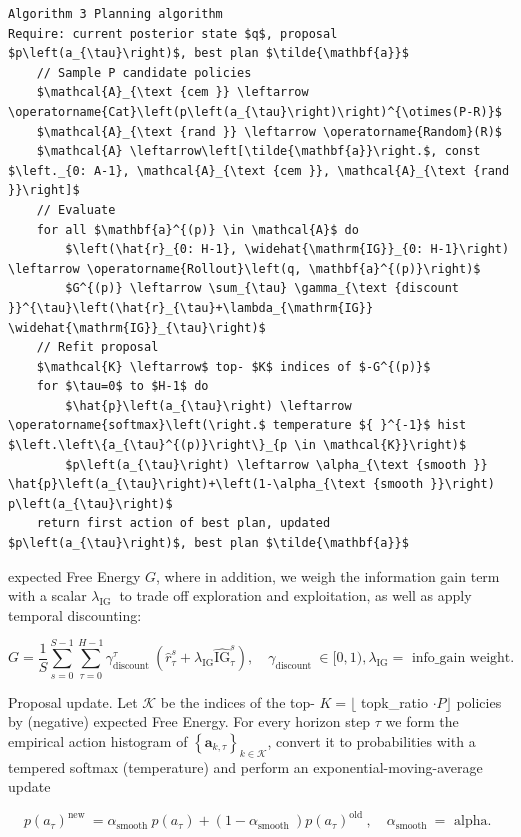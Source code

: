 \documentclass[10pt]{article}
\begin{document}
\begin{verbatim}
Algorithm 3 Planning algorithm
Require: current posterior state $q$, proposal $p\left(a_{\tau}\right)$, best plan $\tilde{\mathbf{a}}$
    // Sample P candidate policies
    $\mathcal{A}_{\text {cem }} \leftarrow \operatorname{Cat}\left(p\left(a_{\tau}\right)\right)^{\otimes(P-R)}$
    $\mathcal{A}_{\text {rand }} \leftarrow \operatorname{Random}(R)$
    $\mathcal{A} \leftarrow\left[\tilde{\mathbf{a}}\right.$, const $\left._{0: A-1}, \mathcal{A}_{\text {cem }}, \mathcal{A}_{\text {rand }}\right]$
    // Evaluate
    for all $\mathbf{a}^{(p)} \in \mathcal{A}$ do
        $\left(\hat{r}_{0: H-1}, \widehat{\mathrm{IG}}_{0: H-1}\right) \leftarrow \operatorname{Rollout}\left(q, \mathbf{a}^{(p)}\right)$
        $G^{(p)} \leftarrow \sum_{\tau} \gamma_{\text {discount }}^{\tau}\left(\hat{r}_{\tau}+\lambda_{\mathrm{IG}} \widehat{\mathrm{IG}}_{\tau}\right)$
    // Refit proposal
    $\mathcal{K} \leftarrow$ top- $K$ indices of $-G^{(p)}$
    for $\tau=0$ to $H-1$ do
        $\hat{p}\left(a_{\tau}\right) \leftarrow \operatorname{softmax}\left(\right.$ temperature ${ }^{-1}$ hist $\left.\left\{a_{\tau}^{(p)}\right\}_{p \in \mathcal{K}}\right)$
        $p\left(a_{\tau}\right) \leftarrow \alpha_{\text {smooth }} \hat{p}\left(a_{\tau}\right)+\left(1-\alpha_{\text {smooth }}\right) p\left(a_{\tau}\right)$
    return first action of best plan, updated $p\left(a_{\tau}\right)$, best plan $\tilde{\mathbf{a}}$
\end{verbatim}

expected Free Energy $G$, where in addition, we weigh the information gain term with a scalar $\lambda_{\text {IG }}$ to trade off exploration and exploitation, as well as apply temporal discounting:

$$
G=\frac{1}{S} \sum_{s=0}^{S-1} \sum_{\tau=0}^{H-1} \gamma_{\text {discount }}^{\tau}\left(\hat{r}_{\tau}^{s}+\lambda_{\mathrm{IG}} \widehat{\mathrm{IG}}_{\tau}^{s}\right), \quad \gamma_{\text {discount }} \in[0,1), \lambda_{\mathrm{IG}}=\text { info_gain weight. }
$$

Proposal update. Let $\mathcal{K}$ be the indices of the top- $K=\lfloor$ topk\_ratio $\cdot P\rfloor$ policies by (negative) expected Free Energy. For every horizon step $\tau$ we form the empirical action histogram of $\left\{\mathbf{a}_{k, \tau}\right\}_{k \in \mathcal{K}}$, convert it to probabilities with a tempered softmax (temperature) and perform an exponential-moving-average update

$$
p\left(a_{\tau}\right)^{\text {new }}=\alpha_{\text {smooth }} p\left(a_{\tau}\right)+\left(1-\alpha_{\text {smooth }}\right) p\left(a_{\tau}\right)^{\text {old }}, \quad \alpha_{\text {smooth }}=\text { alpha. }
$$
\end{document}
